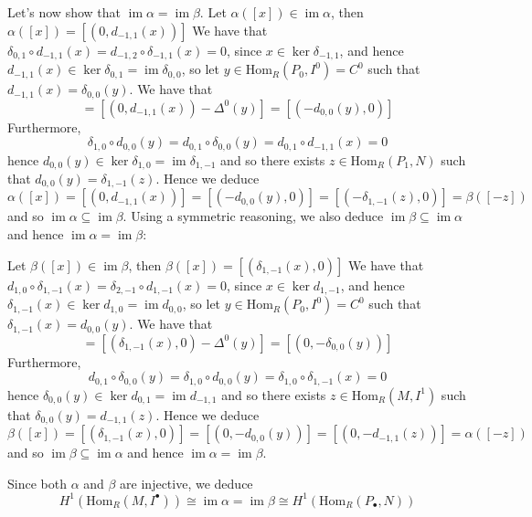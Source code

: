 \documentclass{article}
\newcommand{\Hom}[2]{\mathrm{Hom}_R(#1, #2)}
\DeclareMathOperator{\im}{im}
\begin{document}
Let's now show that $\im \alpha = \im \beta$.
Let $\alpha([x]) \in \im \alpha$, then $\alpha([x])
= [(0, d_{-1, 1}(x))]$
We have that $\delta_{0, 1} \circ d_{-1, 1}(x)
= d_{-1, 2}\circ \delta_{-1, 1}(x) = 0$, since
$x \in \ker \delta_{-1, 1}$, and hence $d_{-1, 1}(x) \in 
\ker \delta_{0, 1} = \im \delta_{0, 0}$, so let $y \in 
\Hom{P_0}{I^0} = C^0$ such that $d_{-1, 1}(x) = \delta_{0, 0}(y)$.
We have that
\begin{equation*}
	[(0, d_{-1, 1}(x))] =
	[(0, d_{-1, 1}(x)) - \Delta^0(y)] =
	[(-d_{0, 0}(y), 0)]
\end{equation*}
Furthermore,
\begin{equation*}
	\delta_{1, 0}\circ d_{0, 0}(y) = d_{0, 1} \circ \delta_{0,0}(y)
	= d_{0, 1} \circ d_{-1, 1}(x) = 0
\end{equation*}
hence $d_{0, 0}(y) \in \ker \delta_{1, 0} = \im \delta_{1, -1}$
and so there exists $z \in \Hom{P_1}{N}$ such that
$d_{0, 0}(y) = \delta_{1, -1}(z)$.
Hence we deduce
\begin{equation*}
	\alpha([x]) = [(0, d_{-1, 1}(x))] = 
	[(-d_{0, 0}(y), 0)] = [(-\delta_{1, -1}(z), 0)]
	= \beta([-z])
\end{equation*}
and so $\im \alpha \subseteq \im \beta$.
Using a symmetric reasoning, we also deduce
$\im \beta \subseteq \im \alpha$ and hence
$\im \alpha = \im \beta$:

Let $\beta([x]) \in \im \beta$, then $\beta([x])
= [(\delta_{1, -1}(x), 0)]$
We have that $d_{1, 0} \circ \delta_{1, -1}(x)
= \delta_{2, -1}\circ d_{1, -1}(x) = 0$, since
$x \in \ker d_{1, -1}$, and hence $\delta_{1, -1}(x) \in 
\ker d_{1, 0} = \im d_{0, 0}$, so let $y \in 
\Hom{P_0}{I^0} = C^0$ such that
$\delta_{1, -1}(x) = d_{0, 0}(y)$.
We have that
\begin{equation*}
	[(\delta_{1, -1}(x), 0)] =
	[(\delta_{1, -1}(x), 0) - \Delta^0(y)] =
	[(0, -\delta_{0, 0}(y))]
\end{equation*}
Furthermore,
\begin{equation*}
	d_{0, 1}\circ \delta_{0, 0}(y) = \delta_{1, 0} \circ d_{0,0}(y)
	= \delta_{1, 0} \circ \delta_{1, -1}(x) = 0
\end{equation*}
hence $\delta_{0, 0}(y) \in \ker d_{0, 1} = \im d_{-1, 1}$
and so there exists $z \in \Hom{M}{I^1}$ such that
$\delta_{0, 0}(y) = d_{-1, 1}(z)$.
Hence we deduce
\begin{equation*}
	\beta([x]) = [(\delta_{1, -1}(x), 0)] = 
	[(0, -d_{0, 0}(y))] = [(0, -d_{-1, 1}(z))]
	= \alpha([-z])
\end{equation*}
and so $\im \beta \subseteq \im \alpha$ and hence
$\im \alpha = \im \beta$.


Since both $\alpha$ and $\beta$ are injective, we deduce
\begin{equation*}
	H^1(\Hom{M}{I^\bullet}) \cong \im \alpha = \im \beta
	\cong H^1(\Hom{P_{\bullet}}{N})
\end{equation*}
\end{document}
